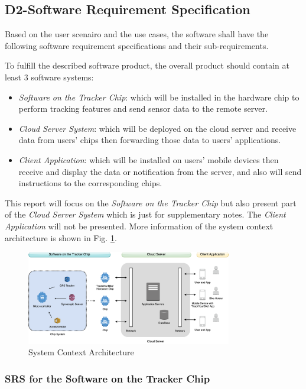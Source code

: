 \documentclass[transmag, conference, onecolumn]{IEEEtran}
\begin{document}
\subsection*{\textbf{D2-Software Requirement Specification}}

Based on the user scenairo and the use cases,
the software shall have the following software requirement specifications and their sub-requirements.

To fulfill the described software product, the overall product should contain at least 3 software systems:

\begin{itemize}
	\item \textit{Software on the Tracker Chip}: which will be installed in the hardware chip to perform tracking features
	      and send sensor data to the remote server.
	\item \textit{Cloud Server System}: which will be deployed on the cloud server and receive data from users' chips
	      then forwarding those data to users' applications.
	\item \textit{Client Application}: which will be installed on users' mobile devices
	      then receive and display the data or notification from the server,
	      and also will send instructions to the corresponding chips.
\end{itemize}

This report will focus on the \textit{Software on the Tracker Chip}
but also present part of the \textit{Cloud Server System} which is just for supplementary notes.
The \textit{Client Application} will not be presented.
More information of the system context architecture is shown in Fig. \ref{fig:sys-context}.

\begin{figure}[!ht]
	\centering
	\includegraphics[width=0.8\textwidth]{./img/f2-sys-context.png}
	\caption{System Context Architecture}
	\label{fig:sys-context}
\end{figure}

\subsubsection*{\textbf{SRS for the Software on the Tracker Chip}}
\end{document}
